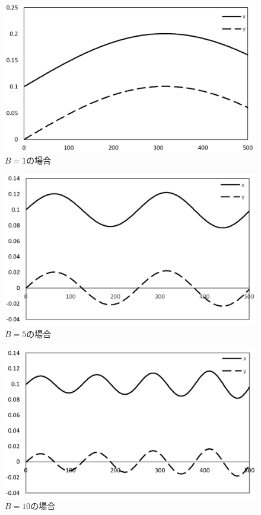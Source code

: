 \documentclass[11pt,titlepage]{jsarticle}
\begin{document}
\begin{figure}[H]
\centering
\includegraphics[width=12cm]{img/kadai9_B1.png}
\caption{$B=1$の場合}
\label{fig:kadai9_B1}
\end{figure}

\begin{figure}[H]
\centering
\includegraphics[width=12cm]{img/kadai9_B5.png}
\caption{$B=5$の場合}
\label{fig:kadai9_B5}
\end{figure}

\begin{figure}[H]
\centering
\includegraphics[width=12cm]{img/kadai9_B10.png}
\caption{$B=10$の場合}
\label{fig:kadai9_B10}
\end{figure}
\end{document}
